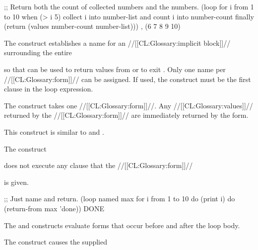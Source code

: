 ;; Return both the count of collected numbers and the numbers.
 (loop for i from 1 to 10
       when (> i 5)
         collect i into number-list
         and count i into number-count
       finally (return (values number-count number-list))) , (6 7 8 9 10) \endcode
  \endsubsubsection%

\endsubsection%

 

The  construct establishes a name for an //[[CL:Glossary:implicit block]]// surrounding the   entire

 so that  can be used to return  values from or to exit .    Only one name per  //[[CL:Glossary:form]]// can be assigned. If used, the  construct must be the first clause in the loop expression.

 The  construct takes one //[[CL:Glossary:form]]//. 
 Any //[[CL:Glossary:values]]// returned by the //[[CL:Glossary:form]]// 
 are immediately returned by the  form.

This construct is similar to  and .

The  construct  

does not execute any  clause that   the  //[[CL:Glossary:form]]//

is given.

\code ;; Just name and return.
 (loop named max
       for i from 1 to 10
       do (print i)
       do (return-from max 'done))   \EV DONE \endcode

\endsubsubsubsection%

\endsubsubsection%

  The  and  constructs evaluate forms that occur before and after the loop body.

The  construct causes the supplied

